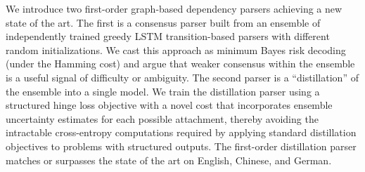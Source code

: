 We introduce two first-order graph-based dependency parsers achieving a new state of the art. The first is a consensus parser built from an ensemble of independently trained greedy LSTM transition-based parsers with different random initializations. We cast this approach as minimum Bayes risk decoding (under the Hamming cost) and argue that weaker consensus within the ensemble is a useful signal of difficulty or ambiguity. The second parser is a ``distillation'' of the ensemble into a single model. We train the distillation parser using a structured hinge loss objective with a novel cost that incorporates ensemble uncertainty estimates for each possible attachment, thereby avoiding the intractable cross-entropy computations required by applying standard distillation objectives to problems with structured outputs. The first-order distillation parser matches or surpasses the state of the art on English, Chinese, and German.
